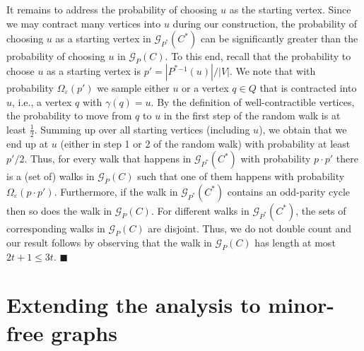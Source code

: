 \documentclass[11pt]{article}
\newcommand{\sq}{\hbox{\rlap{$\sqcap$}$\sqcup$}}
\newcommand{\qed}{\hspace*{\fill}\sq}
\renewcommand{\qed}{\hspace*{\fill}\ensuremath{\blacksquare}}
\newcommand{\COMMENTED}[1]{{}}
\newcommand{\junk}[1]{\COMMENTED{#1}}
\newcommand{\eps}{\ensuremath{\epsilon}}
\def\epsilon{\ensuremath{\varepsilon}}
\begin{document}
It remains to address the probability of choosing $u$ as the starting vertex. Since we may contract many vertices into $u$ during our construction, the probability of choosing $u$ as a starting vertex in $\mathcal{G}_{P^*}(C^*)$ can be significantly greater than the probability of choosing $u$ in $\mathcal{G}_{P}(C)$. To this end, recall that the probability to choose $u$ as a starting vertex is $p' = |P^*{}^{-1}(u)| / |V|$. We note that with probability $\Omega_{\eps}(p')$ we sample either $u$ or a vertex $q\in Q$ that is contracted into $u$, i.e., a vertex $q$ with $\gamma(q) = u$. By the definition of well-contractible vertices, the probability to move from $q$ to $u$ in the first step of the random walk is at least $\frac12$. Summing up over all starting vertices (including $u$), we obtain that we end up at $u$ (either in step 1 or 2 of the random walk) with probability at least $p'/2$. Thus, for every walk that happens in $\mathcal{G}_{P^*}(C^*)$ with probability $p\cdot p'$ there is a (set of) walks in $\mathcal{G}_{P}(C)$ such that one of them happens with probability $\Omega_{\epsilon}(p \cdot p')$. Furthermore, if the walk in $\mathcal{G}_{P^*}(C^*)$ contains an odd-parity cycle then so does the walk in $\mathcal{G}_{P}(C)$. For different walks in $\mathcal{G}_{P^*}(C^*)$, the sets of corresponding walks in $\mathcal{G}_{P}(C)$ are disjoint. Thus, we do not double count and our result follows by observing that the walk in $\mathcal{G}_{P}(C)$ has length at most $2t+1 \le 3t$.
\qed

\junk{
\section{Proof of Lemma \ref{lemma:ExistenceOfH}}
Let $C$ be the final set of cycles $C_k$ obtained by from our reduction.
We claim that the lemma \ref{lemma:ExistenceOfH} is satisfied by graph $G(C_k)$. This can be seen by starting the reduction with $C_1=C$ and observing
that Lemmas \ref{lemma:small-vertices}, \ref{lemma:contractible-vertices}, and \ref{lemma:MainStep} are satisfied without modifications of the set of cycles $C$. Thus, during the reduction
the set $C$ does not change and at the end establishes the properties of Lemma \ref{lemma:ExistenceOfH} via Lemmas \ref{lemma:second_reduction} and \ref{lemma:Selfloops}.
}


\section{Extending the analysis to minor-free graphs}
\label{sec:minor-free}
\end{document}
